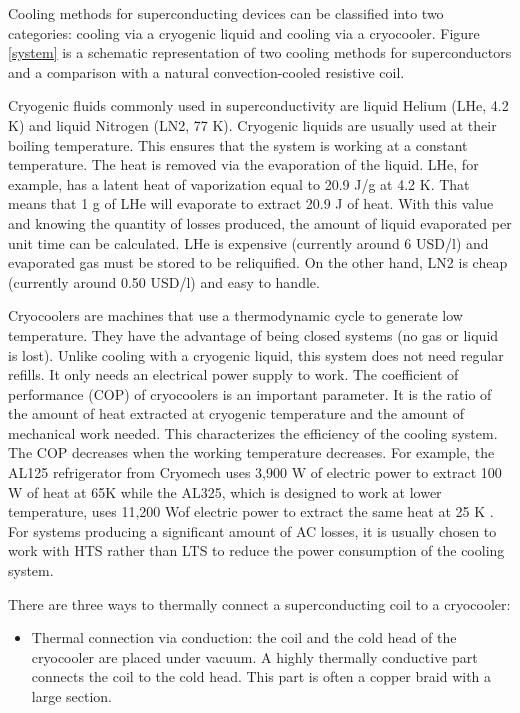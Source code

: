 \documentclass{ws-jmrr}
\begin{document}
\begin{multicols}{2}
Cooling methods for superconducting devices can be classified into two categories: cooling via a cryogenic liquid and cooling via a cryocooler. Figure \ref{system} is a schematic representation of two cooling methods for superconductors and a comparison with a natural convection-cooled resistive coil.\par
Cryogenic fluids commonly used in superconductivity are liquid Helium (LHe, 4.2 K) and liquid Nitrogen (LN2, 77 K). Cryogenic liquids are usually used at their boiling temperature. This ensures that the system is working at a constant temperature. The heat is removed via the evaporation of the liquid. LHe, for example, has a latent heat of vaporization equal to 20.9 J/g at 4.2 K. That means that 1 g of LHe will evaporate to extract 20.9 J of heat. With this value and knowing the quantity of losses produced, the amount of liquid evaporated per unit time can be calculated. LHe is expensive (currently around 6 USD/l) and evaporated gas must be stored to be reliquified. On the other hand, LN2 is cheap (currently around 0.50 USD/l) and easy to handle.\par
Cryocoolers are machines that use a thermodynamic cycle to generate low temperature. They have the advantage of being closed systems (no gas or liquid is lost). Unlike cooling with a cryogenic liquid, this system does not need regular refills. It only needs an electrical power supply to work. The coefficient of performance (COP) of cryocoolers is an important parameter. It is the ratio of the amount of heat extracted at cryogenic temperature and the amount of mechanical work needed. This characterizes the efficiency of the cooling system. The COP decreases when the working temperature decreases. For example, the AL125 refrigerator from Cryomech uses 3,900 W of electric power to extract 100 W of heat at 65K while the AL325, which is designed to work at lower temperature, uses 11,200 Wof electric power to extract the same heat at 25 K \cite{WinNT}. For systems producing a significant amount of AC losses, it is usually chosen to work with HTS rather than LTS to reduce the power consumption of the cooling system.\par
There are three ways to thermally connect a superconducting coil to a cryocooler:
\begin{itemize}[leftmargin=*]
\item Thermal connection via conduction: the coil and the cold head of the cryocooler are placed under vacuum. A highly thermally conductive part connects the coil to the cold head. This part is often a copper braid with a large section.

\end{itemize}
\end{multicols}
\end{document}
